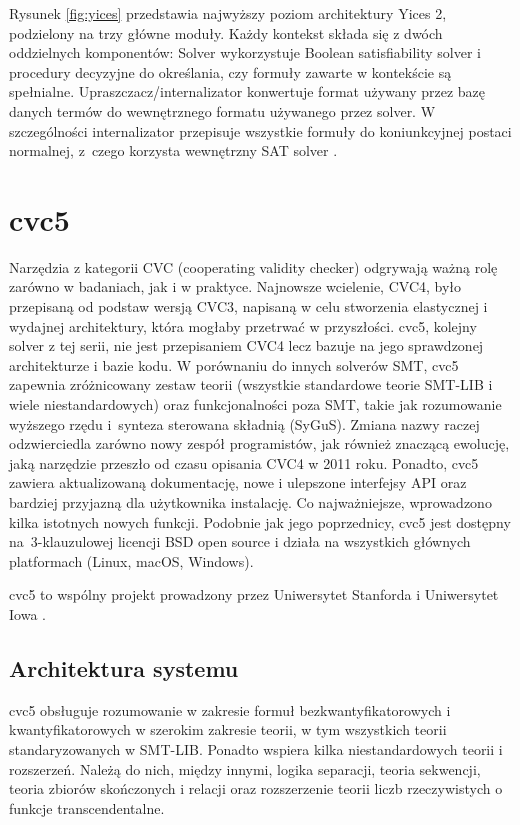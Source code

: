 Rysunek \ref{fig:yices} przedstawia najwyższy poziom architektury Yices 2, podzielony na trzy główne moduły. Każdy kontekst składa się z dwóch oddzielnych komponentów: Solver wykorzystuje Boolean satisfiability solver i procedury decyzyjne do określania, czy formuły zawarte w kontekście są spełnialne. Upraszczacz/internalizator konwertuje format używany przez bazę danych termów do wewnętrznego formatu używanego przez solver. W szczególności
internalizator przepisuje wszystkie formuły do koniunkcyjnej postaci normalnej, z~czego korzysta wewnętrzny SAT solver \cite{yices2.2}.


\section{cvc5}
Narzędzia z kategorii CVC (cooperating validity checker) odgrywają ważną rolę zarówno w badaniach, jak i w praktyce. Najnowsze wcielenie, CVC4, było przepisaną od podstaw wersją CVC3, napisaną w celu stworzenia elastycznej i wydajnej architektury, która mogłaby przetrwać w przyszłości. cvc5, kolejny solver z tej serii, nie jest
przepisaniem CVC4 lecz bazuje na jego sprawdzonej architekturze i bazie kodu. W porównaniu do innych solverów SMT, cvc5 zapewnia zróżnicowany zestaw teorii (wszystkie standardowe teorie SMT-LIB i wiele niestandardowych) oraz funkcjonalności poza SMT, takie jak rozumowanie wyższego rzędu i~synteza sterowana składnią (SyGuS). Zmiana nazwy raczej odzwierciedla zarówno nowy zespół programistów, jak również znaczącą ewolucję, jaką narzędzie przeszło od czasu opisania CVC4 w 2011 roku. Ponadto, cvc5 zawiera aktualizowaną dokumentację, nowe i ulepszone interfejsy API oraz bardziej przyjazną dla użytkownika instalację. Co najważniejsze, wprowadzono kilka istotnych nowych funkcji. Podobnie jak jego poprzednicy, cvc5 jest dostępny na~3-klauzulowej licencji BSD open source i działa na wszystkich głównych platformach (Linux, macOS, Windows).

cvc5 to wspólny projekt prowadzony przez Uniwersytet Stanforda i Uniwersytet Iowa \cite{BarbosaBBKLMMMN22}.

\subsection{Architektura systemu}

cvc5 obsługuje rozumowanie w zakresie formuł bezkwantyfikatorowych i kwantyfikatorowych w szerokim zakresie teorii, w tym wszystkich teorii standaryzowanych w SMT-LIB. Ponadto wspiera kilka niestandardowych teorii i rozszerzeń. Należą do nich, między innymi, logika separacji, teoria sekwencji, teoria zbiorów skończonych i relacji oraz rozszerzenie teorii liczb rzeczywistych o funkcje transcendentalne. 

